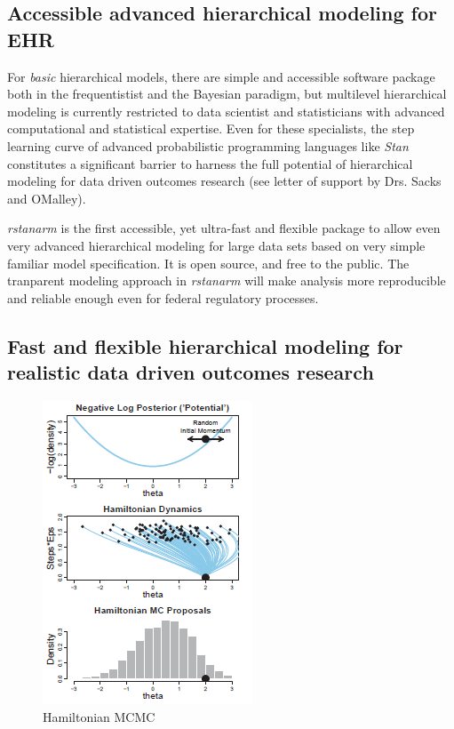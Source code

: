 \documentclass[11pt,notitlepage]{article}
\begin{document}
\subsection*{Accessible advanced hierarchical modeling for EHR}

For \textit{basic} hierarchical models, there are simple and accessible software package both in the frequentistist and the Bayesian paradigm, but multilevel hierarchical modeling is currently restricted to data scientist and statisticians with advanced computational and statistical expertise. Even for these specialists, the step learning curve of advanced probabilistic programming languages like \textit{Stan} constitutes a significant barrier to harness the full potential of hierarchical modeling for data driven outcomes research (see letter of support by Drs. Sacks and OMalley).

\textit{rstanarm} is the first accessible, yet ultra-fast and flexible package to allow even very advanced hierarchical modeling for large data sets based on very simple familiar model specification. It is open source, and free to the public. The tranparent modeling approach in \textit{rstanarm} will make analysis more reproducible and reliable enough even for federal regulatory processes. 

\subsection*{Fast and flexible hierarchical modeling for realistic data driven outcomes research }

\begin{figure}
  \vspace{-15pt}
 \includegraphics[scale=0.9]{Figures/Hamiltonian.png}
  \vspace{-20pt}
  \caption{Hamiltonian MCMC}
    \label{fig:Hamiltonian}
 \vspace{- 30 pt}
\end{figure}
\end{document}
